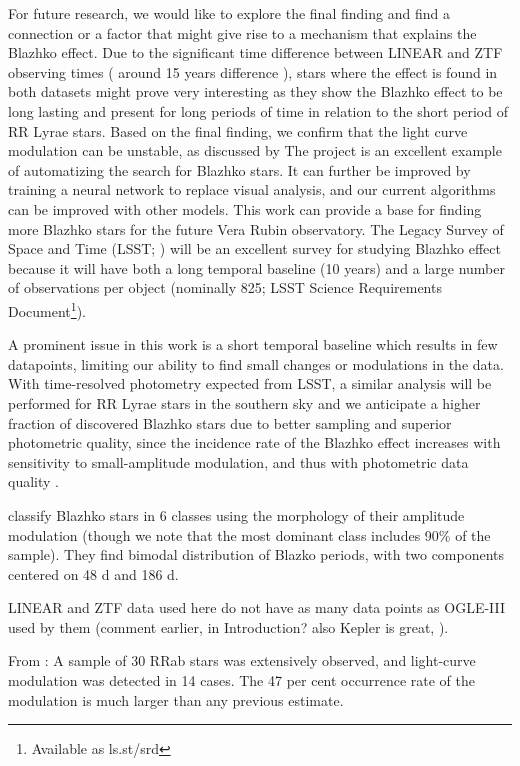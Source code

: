 For future research, we would like to explore the final finding and find a connection or a factor that might give rise to a mechanism that explains the Blazhko effect. Due to the significant time difference between LINEAR and ZTF observing times ( around 15 years difference ), stars
where the effect is found in both datasets might prove very interesting as they show the Blazhko effect to be long lasting and present for long periods of time in relation to the short period of RR Lyrae stars. 
Based on the final finding, we confirm that the light curve modulation can be unstable, as discussed by \cite{2009MNRAS.400.1006J} 
The project is an excellent example of automatizing the search for Blazhko stars. It can further be improved by training a neural network to replace visual analysis, and our current algorithms can be improved with other models. This work can provide a base for finding more Blazhko stars for the future Vera Rubin observatory. The Legacy Survey of Space and Time (LSST; \citealt{2019ApJ...873..111I}) will be an excellent survey for studying Blazhko effect
\citep{2022ApJS..258....4H} because it will have both a long temporal
baseline (10 years) and a large number of observations per object
(nominally 825; LSST Science Requirements Document\footnote{Available as ls.st/srd}).

A prominent issue in this work is a short temporal baseline which results in few datapoints, limiting our ability to find small changes or modulations in the data.
With time-resolved photometry expected from LSST, a similar analysis will be performed for
RR Lyrae stars in the southern sky and we anticipate a higher fraction of discovered Blazhko stars due to better sampling
and superior photometric quality, since the incidence rate of the Blazhko effect increases with sensitivity to small-amplitude modulation, and thus with
photometric data quality \citep{2009MNRAS.400.1006J}.


\citep{2020MNRAS.494.1237S} classify Blazhko stars in 6 classes using the morphology of their amplitude modulation
(though we note that the most dominant class includes 90\% of the sample). They find bimodal distribution of Blazko periods, with two components
centered on 48 d and 186 d.

 LINEAR and ZTF data used here do not
 have as many data points as OGLE-III used by them (comment earlier, in Introduction? also Kepler is great, \citep{2010MNRAS.409.1585B}).
 

 From \cite{2009MNRAS.400.1006J}: A sample of 30 RRab stars was extensively observed, and light-curve modulation was detected in 14 cases. The 47 per cent occurrence rate of the modulation is much larger than any previous estimate.



